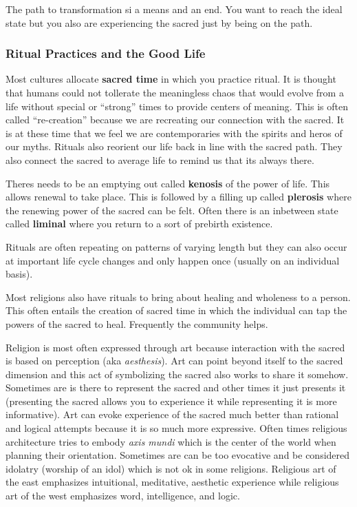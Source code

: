 \documentclass{article}
\begin{document}
The path to transformation si a means and an end. You want to reach the ideal state but you also are experiencing the sacred just by being on the path.

\subsubsection{Ritual Practices and the Good Life}
\label{ssub:ritual_practices_and_the_good_life}

Most cultures allocate \textbf{sacred time} in which you practice ritual. It is thought that humans could not tollerate the meaningless chaos that would evolve from a life without special or ``strong'' times to provide centers of meaning. This is often called ``re-creation'' because we are recreating our connection with the sacred. It is at these time that we feel we are contemporaries with the spirits and heros of our myths. Rituals also reorient our life back in line with the sacred path. They also connect the sacred to average life to remind us that its always there.

Theres needs to be an emptying out called \textbf{kenosis} of the power of life. This allows renewal to take place. This is followed by a filling up called \textbf{plerosis} where the renewing power of the sacred can be felt. Often there is an inbetween state called \textbf{liminal} where you return to a sort of prebirth existence.

Rituals are often repeating on patterns of varying length but they can also occur at important life cycle changes and only happen once (usually on an individual basis).

Most religions also have rituals to bring about healing and wholeness to a person. This often entails the creation of sacred time in which the individual can tap the powers of the sacred to heal. Frequently the community helps.

Religion is most often expressed through art because interaction with the sacred is based on perception (aka \emph{aesthesis}). Art can point beyond itself to the sacred dimension and this act of symbolizing the sacred also works to share it somehow. Sometimes are is there to represent the sacred and other times it just presents it (presenting the sacred allows you to experience it while representing it is more informative). Art can evoke experience of the sacred much better than rational and logical attempts because it is so much more expressive. Often times religious architecture tries to embody \emph{axis mundi} which is the center of the world when planning their orientation. Sometimes are can be too evocative and be considered idolatry (worship of an idol) which is not ok in some religions. Religious art of the east emphasizes intuitional, meditative, aesthetic experience while religious art of the west emphasizes word, intelligence, and logic.
\end{document}
